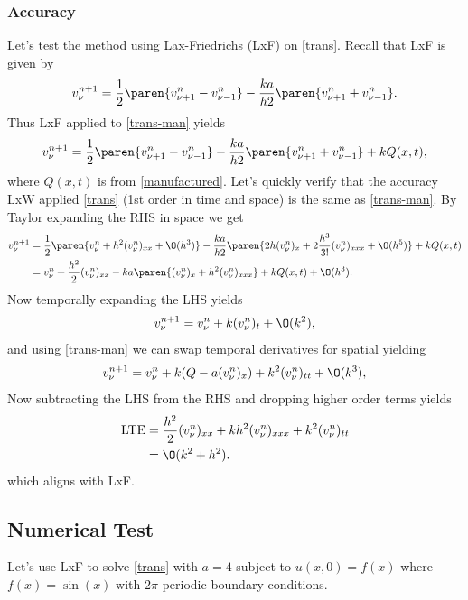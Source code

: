 \documentclass[12pt]{report}
\begin{document}
\subsubsection{Accuracy}
Let's test the method using Lax-Friedrichs (LxF) on \ref{trans}. Recall that LxF is given by
\begin{equation*}
    v_{\nu}^{n+1} = \frac{1}{2}\paren{v_{\nu+1}^n - v_{\nu-1}^n} - \frac{ka}{h2}\paren{v_{\nu + 1}^n + v_{\nu - 1}^n}.
\end{equation*}
Thus LxF applied to \ref{trans-man} yields
\begin{equation*}
    v_{\nu}^{n+1} = \frac{1}{2}\paren{v_{\nu+1}^n - v_{\nu-1}^n} - \frac{ka}{h2}\paren{v_{\nu + 1}^n + v_{\nu - 1}^n} + kQ(x,t),
\end{equation*}
where $Q(x,t)$ is from \ref{manufactured}. Let's quickly verify that the accuracy LxW applied \ref{trans} (1st order in time and space) is the same as \ref{trans-man}. By Taylor expanding the RHS  in space we get
\begin{align*}
    v_{\nu}^{n+1} &= \frac{1}{2}\paren{v_\nu^n + h^2(v_\nu^n)_{xx} + \O(h^3)} - \frac{ka}{h2}\paren{2h(v_\nu^n)_x + 2\frac{h^3}{3!}(v_\nu^n)_{xxx} + \O(h^5)} + kQ(x,t)\\
    &= v_\nu^n + \frac{h^2}{2}(v_\nu^n)_{xx}-ka\paren{(v_\nu^n)_x + h^2(v_\nu^n)_{xxx}} + kQ(x,t) + \O(h^3).
\end{align*}
Now temporally expanding the LHS yields
\begin{equation*}
    v_\nu^{n+1} = v_\nu^n + k (v_\nu^n)_{t} + \O(k^2),
\end{equation*}
and using \ref{trans-man} we can swap temporal derivatives for spatial yielding
\begin{equation*}
    v_\nu^{n+1} = v_\nu^n + k(Q - a(v_\nu^n)_x) + k^2(v_\nu^n)_{tt} + \O(k^3),
\end{equation*}
Now subtracting the LHS from the RHS and dropping higher order terms yields
\begin{align*}
    \text{LTE} &= \frac{h^2}{2}(v_\nu^n)_{xx} + kh^2(v_\nu^n)_{xxx} + k^2(v_\nu^n)_{tt}\\
    &= \O(k^2 + h^2).
\end{align*}
which aligns with LxF. 

\subsection{Numerical Test}
Let's use LxF to solve \ref{trans} with $a=4$ subject to $u(x,0) = f(x)$ where $f(x) = \sin(x)$ with $2\pi$-periodic boundary conditions. 
\end{document}
